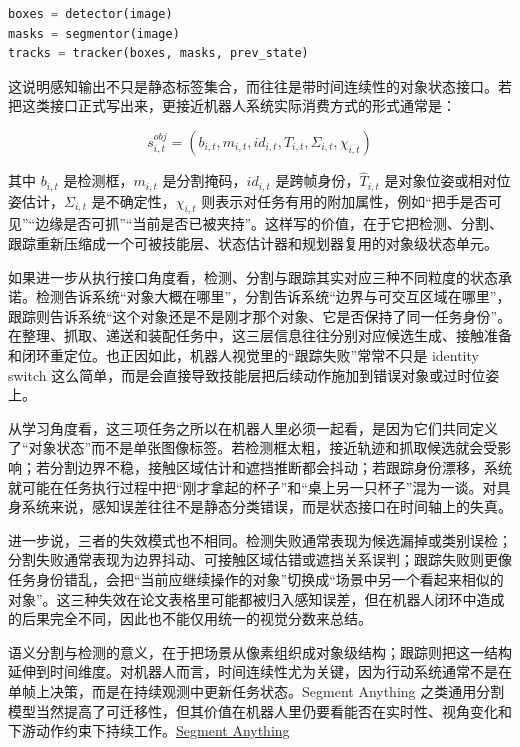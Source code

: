 \begin{lstlisting}[language=python]
boxes = detector(image)
masks = segmentor(image)
tracks = tracker(boxes, masks, prev_state)
\end{lstlisting}

这说明感知输出不只是静态标签集合，而往往是带时间连续性的对象状态接口。若把这类接口正式写出来，更接近机器人系统实际消费方式的形式通常是：

\begingroup
\footnotesize
\begin{equation*}
s_{i,t}^{obj} = (b_{i,t}, m_{i,t}, id_{i,t}, \hat{T}_{i,t}, \Sigma_{i,t}, \chi_{i,t})
\end{equation*}
\endgroup

其中 \(b_{i,t}\) 是检测框，\(m_{i,t}\) 是分割掩码，\(id_{i,t}\) 是跨帧身份，\(\hat{T}_{i,t}\) 是对象位姿或相对位姿估计，\(\Sigma_{i,t}\) 是不确定性，\(\chi_{i,t}\) 则表示对任务有用的附加属性，例如“把手是否可见”“边缘是否可抓”“当前是否已被夹持”。这样写的价值，在于它把检测、分割、跟踪重新压缩成一个可被技能层、状态估计器和规划器复用的对象级状态单元。

如果进一步从执行接口角度看，检测、分割与跟踪其实对应三种不同粒度的状态承诺。检测告诉系统“对象大概在哪里”，分割告诉系统“边界与可交互区域在哪里”，跟踪则告诉系统“这个对象还是不是刚才那个对象、它是否保持了同一任务身份”。在整理、抓取、递送和装配任务中，这三层信息往往分别对应候选生成、接触准备和闭环重定位。也正因如此，机器人视觉里的“跟踪失败”常常不只是 identity switch 这么简单，而是会直接导致技能层把后续动作施加到错误对象或过时位姿上。

从学习角度看，这三项任务之所以在机器人里必须一起看，是因为它们共同定义了“对象状态”而不是单张图像标签。若检测框太粗，接近轨迹和抓取候选就会受影响；若分割边界不稳，接触区域估计和遮挡推断都会抖动；若跟踪身份漂移，系统就可能在任务执行过程中把“刚才拿起的杯子”和“桌上另一只杯子”混为一谈。对具身系统来说，感知误差往往不是静态分类错误，而是状态接口在时间轴上的失真。

进一步说，三者的失效模式也不相同。检测失败通常表现为候选漏掉或类别误检；分割失败通常表现为边界抖动、可接触区域估错或遮挡关系误判；跟踪失败则更像任务身份错乱，会把“当前应继续操作的对象”切换成“场景中另一个看起来相似的对象”。这三种失效在论文表格里可能都被归入感知误差，但在机器人闭环中造成的后果完全不同，因此也不能仅用统一的视觉分数来总结。

语义分割与检测的意义，在于把场景从像素组织成对象级结构；跟踪则把这一结构延伸到时间维度。对机器人而言，时间连续性尤为关键，因为行动系统通常不是在单帧上决策，而是在持续观测中更新任务状态。Segment Anything 之类通用分割模型当然提高了可迁移性，但其价值在机器人里仍要看能否在实时性、视角变化和下游动作约束下持续工作。\href{https://arxiv.org/abs/2304.02643}{Segment Anything}

